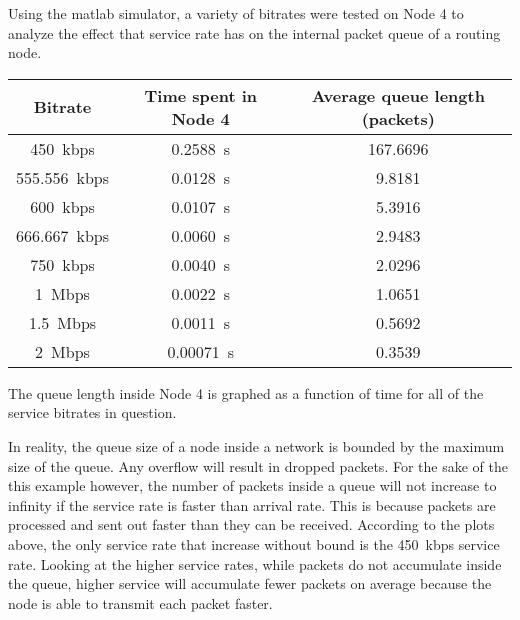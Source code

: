 \documentclass[12pt,letterpaper]{article}
\begin{document}
Using the matlab simulator, a variety of bitrates were tested on Node 4 to analyze the
effect that service rate has on the internal packet queue of a routing node.

\pagebreak

\begin{table}[h!]
    \renewcommand{\arraystretch}{1.3}
    \setlength{\tabcolsep}{12pt}
    \begin{center}
        \begin{tabular}{|c|c|c|}\hline
        Bitrate & Time spent in Node 4 & Average queue length (packets)\\\hline
        \SI{450}{kbps} & \SI{0.2588}{s} & 167.6696 \\\hline
        \SI{555.556}{kbps} & \SI{0.0128}{s} & 9.8181 \\\hline
        \SI{600}{kbps} & \SI{0.0107}{s} & 5.3916 \\\hline
        \SI{666.667}{kbps} & \SI{0.0060}{s} & 2.9483 \\\hline
        \SI{750}{kbps} & \SI{0.0040}{s} & 2.0296 \\\hline
        \SI{1}{Mbps} & \SI{0.0022}{s} & 1.0651 \\\hline
        \SI{1.5}{Mbps} & \SI{0.0011}{s} & 0.5692 \\\hline
        \SI{2}{Mbps} & \SI{0.00071}{s} & 0.3539 \\\hline
        \end{tabular}
    \end{center}
    \label{tab:tim}
\end{table}

The queue length inside Node 4 is graphed as a function of time for all of the
service bitrates in question.


In reality, the queue size of a node inside a network is bounded by the maximum size
of the queue. Any overflow will result in dropped packets. For the sake of the this
example however, the number of packets inside a queue will not increase to infinity
if the service rate is faster than arrival rate. This is because packets are processed
and sent out faster than they can be received. According to the plots above, the only
service rate that increase without bound is the \SI{450}{kbps} service rate. Looking at
the higher service rates, while packets do not accumulate inside the queue, higher service
will accumulate fewer packets on average because the node is able to transmit each packet
faster.

\pagebreak
\end{document}
